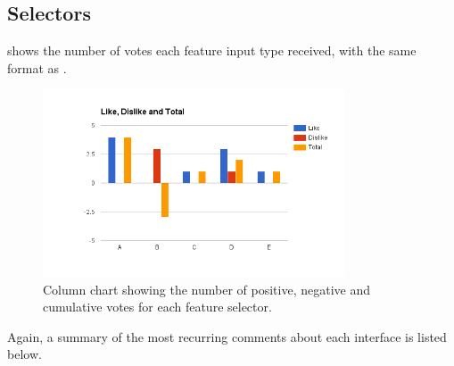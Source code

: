 \documentclass{mproj}
\begin{document}
\subsection*{Selectors}

 shows the number of votes each feature input type received, with the same format as . 

\begin{figure}[h]
	\centering
	\includegraphics[width=0.8\textwidth]{images/selector_feedback}
	\caption{Column chart showing the number of positive, negative and cumulative votes for each feature selector.}
	\label{fig:selector_feedback}
\end{figure}

Again, a summary of the most recurring comments about each interface is listed below.
\end{document}
